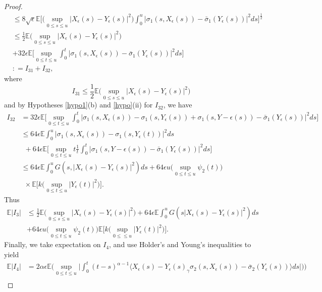\documentclass[a4 paper, 12pt]{report}
\theoremstyle{plain}
\begin{document}
\begin{proof}
\begin{align*}
&\leq 8\sqrt{\epsilon}\mathbb{E}\bigg[\bigg(\sup_{0\leq s\leq u}|X_\epsilon(s) - Y_\epsilon(s)|^2\bigg)\int_0^u |\sigma_1(s,X_\epsilon(s)) - \bar{\sigma}_1(Y_\epsilon(s))|^2ds\bigg]^{\frac{1}{2}}\\
&\leq \frac{1}{2}\mathbb{E}\bigg(\sup_{0\leq s\leq u}|X_\epsilon(s) - Y_\epsilon(s)|^2\bigg)\\
&+32\epsilon\mathbb{E}\bigg[\sup_{0\leq t\leq u}\int_0^t|\sigma_1(s,X_\epsilon(s)) - \bar{\sigma}_1(Y_\epsilon(s))|^2ds\bigg]\\
&: = I_{31}+I_{32},
\end{align*}
where 
$$
I_{31}\leq \frac{1}{2}\mathbb{E}\bigg(\sup_{0\leq s\leq u}|X_\epsilon(s) - Y_\epsilon(s)|^2\bigg)
$$
and by Hypotheses \ref{hypo1}(b) and \ref{hypo}(ii) for $I_{32}$, we have
\begin{align*}
I_{32}& = 32\epsilon\mathbb{E}\bigg[\sup_{0\leq t\leq u}\int_0^t|\sigma_1(s,X_\epsilon(s)) - \sigma_1(s,Y_\epsilon(s))+\sigma_1(s,Y-\epsilon(s)) - \bar{\sigma}_1(Y_\epsilon(s))|^2ds\bigg]\\
&\leq 64\epsilon\mathbb{E}\int_0^u|\sigma_1(s,X_\epsilon(s)) - \sigma_1(s,Y_\epsilon(t))|^2ds\\
&~~+64\epsilon\mathbb{E}\bigg[\sup_{0\leq t\leq u}t\frac{1}{t}\int_0^t|\sigma_1(s,Y-\epsilon(s)) - \bar{\sigma}_1(Y_\epsilon(s))|^2ds\bigg]\\
&\leq 64\epsilon\mathbb{E}\int_0^u G(s,|X_\epsilon(s) - Y_\epsilon(s)|^2)ds+64\epsilon u \bigg(\sup_{0\leq t\leq u}\psi_2(t)\bigg)\\
&~~\times\mathbb{E}\bigg[k\bigg(\sup_{0\leq t\leq u}|Y_\epsilon(t)|^2\bigg)\bigg].
\end{align*}
Thus 
\begin{equation}\label{4.5}
\begin{split}
\mathbb{E}|I_3|&\leq \frac{1}{2}\mathbb{E}\bigg(\sup_{0\leq s\leq u}|X_\epsilon(s) - Y_\epsilon(s)|^2\bigg)+64\epsilon\mathbb{E}\int_0^u G(s|X_\epsilon(s) - Y_\epsilon(s)|^2)ds\\
&+64 \epsilon u\bigg(\sup_{0\leq t\leq u}\psi_2(t)\bigg)\mathbb{E}\bigg[k\bigg(\sup_{0\leq \leq u}|Y_\epsilon(t)|^2\bigg)\bigg].
\end{split}
\end{equation}
Finally, we take expectation on $I_4$, and use H$\ddot{\mbox{o}}$lder’s and Young’s inequalities to
yield
\begin{align*}
\mathbb{E}|I_4|& = 2\alpha\epsilon\mathbb{E}\bigg(\sup_{0\leq t\leq u}\bigg|\int_0^t(t-s)^{\alpha -1}\langle X_\epsilon(s) - Y_\epsilon(s)_\gamma\sigma_2(s,X_\epsilon(s)) - \bar{\sigma}_2(Y_\epsilon(s))\rangle ds\bigg|\bigg)\bigg)\\

\end{align*}
\end{proof}
\end{document}
